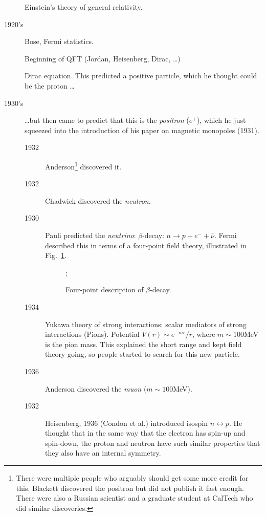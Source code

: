 \begin{description}
    Einstein's theory of general relativity.
  \item[1920's] Bose, Fermi statistics.
    \par Beginning of QFT (Jordan, Heisenberg, Dirac, \dots)
    \par Dirac equation. This predicted a positive particle, which he thought could be the proton \dots
  \item[1930's] \dots but then came to predict that this is the \emph{positron} ($e^+$), which he just squeezed into the introduction of his paper on magnetic monopoles (1931).\par
    \begin{description}
      \item[1932] Anderson\footnote{There were multiple people who arguably should get some more credit for this. Blackett discovered the positron but did not publish it fast enough. There were also a Russian scientist and a graduate student at CalTech who did similar discoveries.} discovered it.
      \item[1932] Chadwick discovered the \emph{neutron}.
      \item[1930] Pauli predicted the \emph{neutrino}: $\beta$-decay: $n \to p + e^- + \overline{\nu}$. Fermi described this in terms of a four-point field theory, illustrated in Fig.~\ref{fig:l2d1}.
      \begin{figure}[tbh]
	\centering
	;
	\caption{Four-point description of $\beta$-decay.}
	\label{fig:l2d1}
      \end{figure}
    \item[1934] Yukawa theory of strong interactions: scalar mediators of strong interactions (Pions).
      Potential $V(r) \sim e^{-mr} / r$, where $m \sim 100$MeV is the pion mass.
      This explained the short range and kept field theory going, so people started to search for this new particle.
    \item[1936] Anderson discovered the \emph{muon} ($m \sim 100$MeV).
    \item[1932] Heisenberg, 1936 (Condon et al.) introduced isospin $n \leftrightarrow p$.
      He thought that in the same way that the electron has spin-up and spin-down, the proton and neutron have such similar properties that they also have an internal symmetry.
    \end{description}

\end{description}
